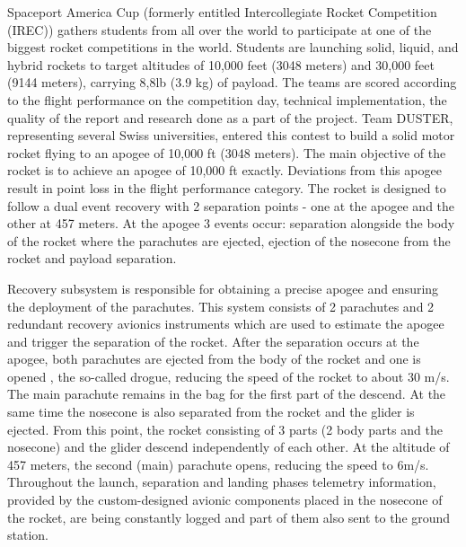\documentclass[]{iac}
\begin{document}

Spaceport America Cup (formerly entitled Intercollegiate Rocket Competition (IREC)) gathers students from all over the world to participate at one of the biggest rocket competitions in the world. Students are launching solid, liquid, and hybrid rockets to target altitudes of 10,000 feet (3048 meters) and 30,000 feet (9144 meters), carrying 8,8lb (3.9 kg) of payload. The teams are scored according to the flight performance on the competition day, technical implementation, the quality of the report and research done as a part of the project.
Team DUSTER, representing several Swiss universities, entered this contest to build a solid motor rocket flying to an apogee of 10,000 ft (3048 meters).
The main objective of the rocket is to achieve an apogee of 10,000 ft exactly. Deviations from this apogee result in point loss in the flight performance category.  The rocket is designed to follow a dual event recovery with 2 separation points - one at the apogee and the other at 457 meters. At the apogee 3 events occur: separation alongside the body of the rocket where the parachutes are ejected, ejection of the nosecone from the rocket and payload separation.

Recovery subsystem is responsible for obtaining 
a precise apogee and ensuring the deployment of the parachutes. This system consists of 2 parachutes and 2 redundant recovery avionics instruments which are used to estimate the apogee and trigger the separation of the rocket. After the separation occurs at the apogee, both parachutes are ejected from the body of the rocket and one is opened , the so-called drogue, reducing the speed of the rocket to about 30 m/s. The main parachute remains in the bag for the first part of the descend. At the same time the nosecone is also separated from the rocket and the glider is ejected. From this point, the rocket consisting of 3 parts (2 body parts and the nosecone) and the glider descend independently of each other. At the altitude of 457 meters, the second (main) parachute opens, reducing the speed to 6m/s. Throughout the launch, separation and landing phases telemetry information, provided by the custom-designed avionic components placed in the nosecone of the rocket, are being constantly logged and part of them also sent to the ground station.
\end{document}
